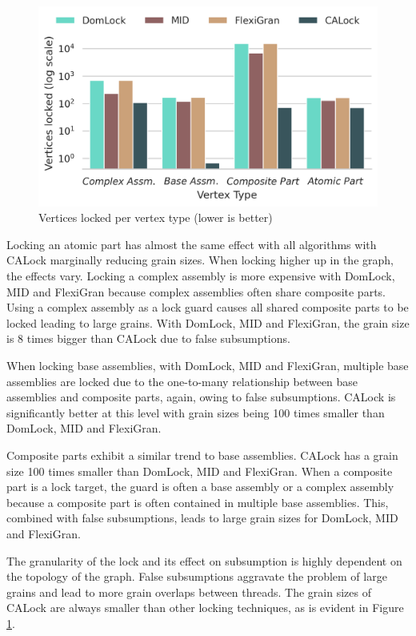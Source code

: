 \begin{figure}[h]
	\centering
	\captionsetup{justification=centering}
	\includegraphics[width=.7\columnwidth]{figures/PerformanceCharts/ContainmentRatio}
	\caption{Vertices locked per vertex type (lower is better)}
	\label{nodesLockedPerNodeType}
\end{figure}

Locking an atomic part has almost the same effect with all algorithms with CALock marginally reducing grain sizes. 
When locking higher up in the graph, the effects vary. 
Locking a complex assembly is more expensive with DomLock, MID and FlexiGran because complex assemblies often share composite parts. Using a complex assembly as a lock guard causes all shared composite parts to be locked leading to large grains. With DomLock, MID and FlexiGran, the grain size is 8 times bigger than CALock due to false subsumptions. 

When locking base assemblies, with DomLock, MID and FlexiGran, multiple base assemblies are locked due to the one-to-many relationship between base assemblies and composite parts, again, owing to false subsumptions. CALock is significantly better at this level with grain sizes being 100 times smaller than DomLock, MID and FlexiGran.

Composite parts exhibit a similar trend to base assemblies. CALock has a grain size 100 times smaller than DomLock, MID and FlexiGran. When a composite part is a lock target, the guard is often a base assembly or a complex assembly because a composite part is often contained in multiple base assemblies. This, combined with false subsumptions, leads to large grain sizes for DomLock, MID and FlexiGran.

The granularity of the lock and its effect on subsumption is highly dependent on the topology of the graph. 
False subsumptions aggravate the problem of large grains and lead to more grain overlaps between threads. 
The grain sizes of CALock are always smaller than other locking techniques, as is evident in Figure \ref{nodesLockedPerNodeType}.


